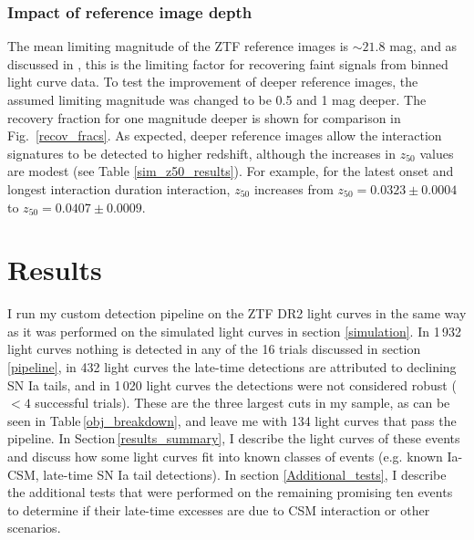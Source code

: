 \documentclass[a4paper,oneside,12pt, class=Latex/Classes/PhDthesisPSnPDF, crop=false]{standalone}
\begin{document}
\subsubsection{Impact of reference image depth}
\label{impact_refdepth}
The mean limiting magnitude of the ZTF reference images is $\sim 21.8$ mag, and as discussed in \citep{ref_uncert}, this is the limiting factor for recovering faint signals from binned light curve data. To test the improvement of deeper reference images, the assumed limiting magnitude was changed to be 0.5 and 1 mag deeper. The recovery fraction for one magnitude deeper is shown for comparison in Fig.~\ref{recov_fracs}. As expected, deeper reference images allow the interaction signatures to be detected to higher redshift, although the increases in $z_{50}$ values are modest (see Table \ref{sim_z50_results}). For example, for the latest onset and longest interaction duration interaction, $z_{50}$ increases from $z_{50} = 0.0323 \pm 0.0004$ to $z_{50} = 0.0407 \pm 0.0009$.


\section{Results}
\label{DR2_results}
I run my custom detection pipeline on the ZTF DR2 light curves in the same way as it was performed on the simulated light curves in section \ref{simulation}. In 1\,932 light curves nothing is detected in any of the 16 trials discussed in section \ref{pipeline}, in 432 light curves the late-time detections are attributed to declining SN Ia tails, and in 1\,020 light curves the detections were not considered robust ($<4$ successful trials). These are the three largest cuts in my sample, as can be seen in Table\,\ref{obj_breakdown}, and leave me with 134 light curves that pass the pipeline. In Section\,\ref{results_summary}, I describe the light curves of these events and discuss how some light curves fit into known classes of events (e.g. known Ia-CSM, late-time SN Ia tail detections). In section \ref{Additional_tests}, I describe the additional tests that were performed on the remaining promising ten events to determine if their late-time excesses are due to CSM interaction or other scenarios.
\end{document}
